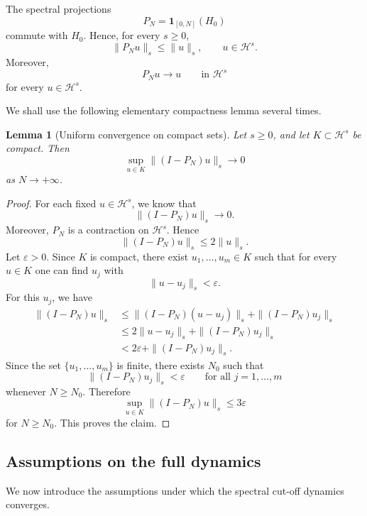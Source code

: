 \documentclass[11pt]{amsart}
\theoremstyle{plain}
\newtheorem{lemma}[theorem]{Lemma}
\theoremstyle{definition}
\theoremstyle{remark}
\newcommand{\Hilb}{\mathcal H}
\begin{document}
The spectral projections
\[
        P_N=\mathbf 1_{[0,N]}(H_0)
\]
commute with \(H_0\).  Hence, for every \(s\geq0\),
\[
        \|P_Nu\|_s\leq \|u\|_s,
        \qquad u\in\Hilb^s.
\]
Moreover,
\[
        P_Nu\longrightarrow u
        \qquad\text{in }\Hilb^s
\]
for every \(u\in\Hilb^s\).

We shall use the following elementary compactness lemma several times.

\begin{lemma}[Uniform convergence on compact sets]
\label{lem:uniform-tail}
Let \(s\geq0\), and let \(K\subset\Hilb^s\) be compact.  Then
\[
        \sup_{u\in K}\|(I-P_N)u\|_s
        \longrightarrow0
\]
as \(N\to+\infty\).
\end{lemma}

\begin{proof}
For each fixed \(u\in\Hilb^s\), we know that
\[
        \|(I-P_N)u\|_s\longrightarrow0.
\]
Moreover, \(P_N\) is a contraction on \(\Hilb^s\).  Hence
\[
        \|(I-P_N)u\|_s\leq 2\|u\|_s.
\]
Let \(\varepsilon>0\).  Since \(K\) is compact, there exist
\(u_1,\ldots,u_m\in K\) such that for every \(u\in K\) one can find
\(u_j\) with
\[
        \|u-u_j\|_s<\varepsilon.
\]
For this \(u_j\), we have
\[
\begin{aligned}
        \|(I-P_N)u\|_s
        &\leq
        \|(I-P_N)(u-u_j)\|_s
        +
        \|(I-P_N)u_j\|_s    \\
        &\leq
        2\|u-u_j\|_s
        +
        \|(I-P_N)u_j\|_s    \\
        &<
        2\varepsilon
        +
        \|(I-P_N)u_j\|_s .
\end{aligned}
\]
Since the set \(\{u_1,\ldots,u_m\}\) is finite, there exists
\(N_0\) such that
\[
        \|(I-P_N)u_j\|_s<\varepsilon
        \qquad
        \text{for all }j=1,\ldots,m
\]
whenever \(N\geq N_0\).  Therefore
\[
        \sup_{u\in K}\|(I-P_N)u\|_s
        \leq 3\varepsilon
\]
for \(N\geq N_0\).  This proves the claim.
\end{proof}

\subsection{Assumptions on the full dynamics}

We now introduce the assumptions under which the spectral cut-off
dynamics converges.
\end{document}
